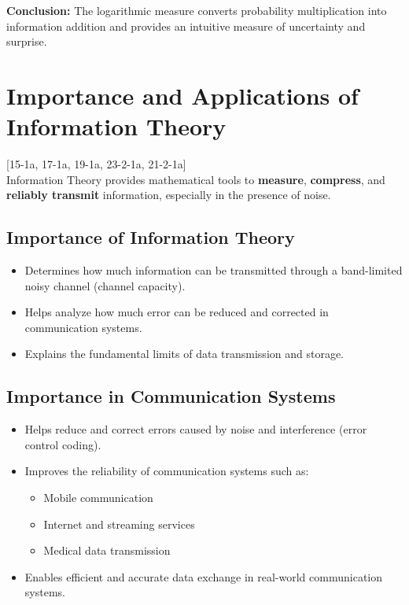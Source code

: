 \documentclass[11pt,a4paper]{book}
\newcounter{qna}[chapter]
\renewcommand{\theqna}{\thechapter.\arabic{qna}}
\newenvironment{questionanswerbox}{
    \refstepcounter{qna}%
    \begin{tcolorbox}[
        enhanced,
        breakable,
        colback=softlavender!10,
        colframe=softlavender!200,
        title={Example~\theqna}, %
        fonttitle=\bfseries,
        coltitle=white,
        colbacktitle=softlavender!200,
        sharp corners,
        boxrule=1pt,
        left=8pt,
        right=8pt,
        top=6pt,
        bottom=6pt
    ]
}{
    \end{tcolorbox}
}
\begin{document}
\begin{questionanswerbox}
    \textbf{Conclusion:} The logarithmic measure converts probability multiplication into information addition and provides an intuitive measure of uncertainty and surprise.
\end{questionanswerbox}

\section{Importance and Applications of Information Theory}
[15-1a, 17-1a, 19-1a, 23-2-1a, 21-2-1a]\\

Information Theory provides mathematical tools to \textbf{measure}, \textbf{compress}, and \textbf{reliably transmit} information, especially in the presence of noise.

\subsection{Importance of Information Theory}

\begin{itemize}
    \item Determines how much information can be transmitted through a band-limited noisy channel (channel capacity).
    \item Helps analyze how much error can be reduced and corrected in communication systems.
    \item Explains the fundamental limits of data transmission and storage.
\end{itemize}

\subsection{Importance in Communication Systems}

\begin{itemize}
    \item Helps reduce and correct errors caused by noise and interference (error control coding).
    \item Improves the reliability of communication systems such as:
          \begin{itemize}
              \item Mobile communication
              \item Internet and streaming services
              \item Medical data transmission
          \end{itemize}
    \item Enables efficient and accurate data exchange in real-world communication systems.
\end{itemize}
\end{document}
